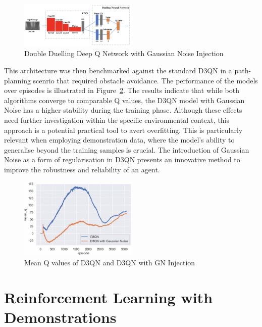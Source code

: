 \begin{figure}[htbp]
  \centering
  \includegraphics[width=0.5\textwidth]{background/fyp13-noise-injection.png}
  \caption{Double Duelling Deep Q Network with Gaussian Noise Injection}
\label{fig:fyp13-d3qn-noise}
\end{figure}

This architecture was then benchmarked against the standard D3QN in a path-planning scenrio that required obstacle avoidance.
The performance of the models over episodes is illustrated in Figure~\ref{fig:fyp13-results}.
The results indicate that while both algorithms converge to comparable Q values, the D3QN model with Gaussian Noise has a higher stability during the training phase.
Although these effects need further investigation within the specific environmental context, this approach is a potential practical tool to avert overfitting. 
This is particularly relevant when employing demonstration data, where the model's ability to generalise beyond the training samples is crucial. 
The introduction of Gaussian Noise as a form of regularisation in D3QN presents an innovative method to improve the robustness and reliability of an agent.

\begin{figure}[H]
  \centering
  \includegraphics[width=0.5\textwidth]{background/fyp13-noise-results.png}
  \caption{Mean Q values of D3QN and D3QN with GN Injection}
\label{fig:fyp13-results}
\end{figure}

\section{Reinforcement Learning with Demonstrations}

